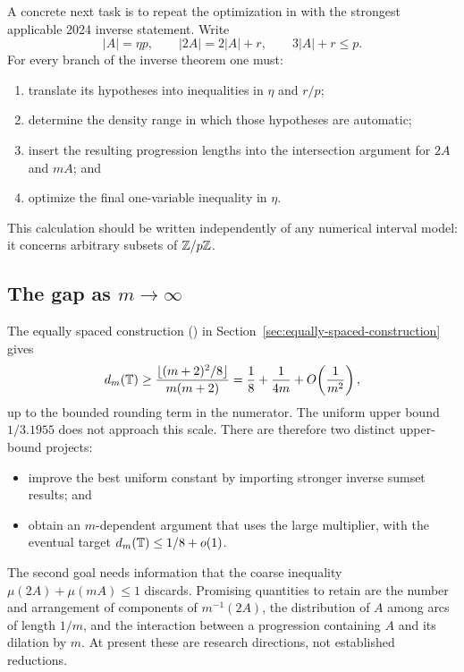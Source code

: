 A concrete next task is to repeat the optimization in
\cite[Section~3]{CandelaGonzalezSanchezGrynkiewicz2021} with the strongest
applicable 2024 inverse statement.  Write
\[
    |A|=\eta p,
    \qquad
    |2A|=2|A|+r,
    \qquad
    3|A|+r\leq p.
\]
For every branch of the inverse theorem one must:
\begin{enumerate}
    \item translate its hypotheses into inequalities in \(\eta\) and \(r/p\);
    \item determine the density range in which those hypotheses are automatic;
    \item insert the resulting progression lengths into the intersection
          argument for \(2A\) and \(mA\); and
    \item optimize the final one-variable inequality in \(\eta\).
\end{enumerate}
This calculation should be written independently of any numerical interval
model: it concerns arbitrary subsets of \(\mathbb Z/p\mathbb Z\).

\subsection{The gap as \texorpdfstring{$m\to\infty$}{m tends to infinity}}

The equally spaced construction
() in
Section~\ref{sec:equally-spaced-construction} gives
\[
    d_m(\mathbb T)\geq
    \frac{\lfloor(m+2)^2/8\rfloor}{m(m+2)}
    =\frac18+\frac{1}{4m}+O\!\left(\frac1{m^2}\right),
\]
up to the bounded rounding term in the numerator.  The uniform upper bound
\(1/3.1955\) does not approach this scale.  There are therefore two distinct
upper-bound projects:
\begin{itemize}
    \item improve the best uniform constant by importing stronger inverse
          sumset results; and
    \item obtain an \(m\)-dependent argument that uses the large multiplier,
          with the eventual target \(d_m(\mathbb T)\leq1/8+o(1)\).
\end{itemize}

The second goal needs information that the coarse inequality
\(\mu(2A)+\mu(mA)\leq1\) discards.  Promising quantities to retain are the
number and arrangement of components of \(m^{-1}(2A)\), the distribution of
\(A\) among arcs of length \(1/m\), and the interaction between a progression
containing \(A\) and its dilation by \(m\).  At present these are research
directions, not established reductions.
